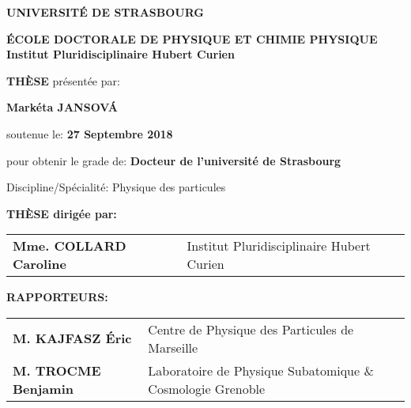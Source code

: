 \begin{titlepage}
    \begin{center}
    \vspace*{-2cm}
        {\Large \textbf{UNIVERSITÉ DE STRASBOURG}}\\

        \vspace*{1cm}

        {\large \textbf{ÉCOLE DOCTORALE DE PHYSIQUE ET CHIMIE PHYSIQUE}}\\
        \textbf{Institut Pluridisciplinaire Hubert Curien}\\

        \vspace*{1cm}

        {\LARGE \textbf{TH\`{E}SE}} présentée par:

        \vspace*{0.3cm}

        {\Large \textbf{Mark\'{e}ta JANSOV\'{A}}}

        soutenue le: \textbf{27 Septembre 2018}
        

        \vspace*{1cm}

        pour obtenir le grade de: \textbf{Docteur de l'université de Strasbourg}


        Discipline/Spécialité: Physique des particules


        \vspace*{1cm}

        \fbox{
        \parbox{\textwidth}{\centering \LARGE \textbf{Recherche du partenaire supersymétrique du quark top et mesure des propriétés des dépôts dans le trajectographe à pistes de silicium de l’expérience CMS au Run 2}} %
         }

        \end{center}

        \vspace*{1cm}

        {\large \textbf{THÈSE dirigée par:}}\\
        \begin{tabular}{ll}
        \hspace{1cm}    \textbf{Mme. COLLARD Caroline}          & Institut Pluridisciplinaire Hubert Curien \\
        \end{tabular}
        
        {\large \textbf{RAPPORTEURS:}} \\
        \begin{tabular}{ll}
            \hspace{1cm}    \textbf{M. KAJFASZ Éric}                & Centre de Physique des Particules de Marseille\\
            \hspace{1cm}    \textbf{M. TROCME Benjamin}             & Laboratoire de Physique Subatomique \& Cosmologie Grenoble \\
        \end{tabular}
        \vspace*{0.5cm}
        \hline


\end{titlepage}
